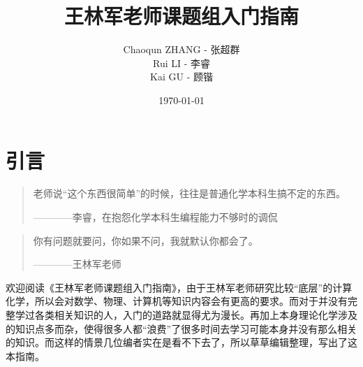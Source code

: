 \documentclass[12pt,a4paper,openany,twoside]{book}
\title{王林军老师课题组入门指南}
\author{Chaoqun ZHANG - 张超群\\Rui LI - 李睿\\Kai GU - 顾锴}
\date{\today}
\numberwithin{equation}{section}
\begin{document}
    \maketitle
    \tableofcontents
    \setcounter{page}{1}   %
    \makeatletter
    \let\ps@plain\ps@empty
    \makeatother
    \tableofcontents                                    %
    \mainmatter\medskip    %
    
    
    
    \newpage
    \chapter*{引言}
      \begin{quote}
        老师说“这个东西很简单”的时候，往往是普通化学本科生搞不定的东西。
        \begin{flushright}
          ————李睿，在抱怨化学本科生编程能力不够时的调侃
        \end{flushright}
      \end{quote}
      \begin{quote}
        你有问题就要问，你如果不问，我就默认你都会了。
        \begin{flushright}
          ————王林军老师
        \end{flushright}
      \end{quote}

      欢迎阅读《王林军老师课题组入门指南》，由于王林军老师研究比较“底层”的计算化学，所以会对数学、物理、计算机等知识内容会有更高的要求。而对于并没有完整学过各类相关知识的人，入门的道路就显得尤为漫长。再加上本身理论化学涉及的知识点多而杂，使得很多人都“浪费”了很多时间去学习可能本身并没有那么相关的知识。而这样的情景几位编者实在是看不下去了，所以草草编辑整理，写出了这本指南。
\end{document}
